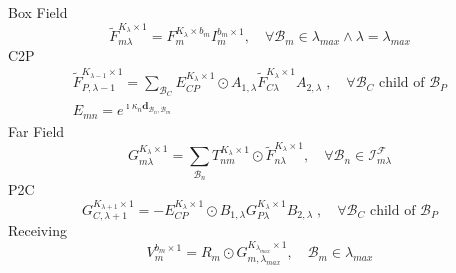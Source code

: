 \documentclass{report}
\begin{document}
Box Field
\begin{equation}
\tilde{F}_{m\lambda} ^{K_{\lambda} \times 1}= F_m^{{K_{\lambda}}\times b_m}I_m^{b_m\times 1}, \quad \forall \mathcal{B}_m \in \lambda_{max} \wedge  \lambda = \lambda_{max}
\end{equation}
C2P
\begin{equation}
\begin{aligned}
\tilde{F}_{P,\lambda-1} ^{K_{\lambda-1} \times 1} =\sum_{\mathcal{B}_C} E_{CP}^{K_{\lambda} \times 1} \odot A_{1,\lambda}\tilde{F}_{C\lambda} ^{K_{\lambda} \times 1}A_{2,\lambda}\;,\quad \forall \mathcal{B}_C \text{ child of } \mathcal{B}_P\\
E_{mn}=e^{\imath\kappa_n\mathbf{d}_{\mathcal{B}_n,\mathcal{B}_m}}~~~~~~~~~~~~~~~~~~~~~~~
\end{aligned}
\end{equation}
Far Field
\begin{equation}
G_{m\lambda}^{K_{\lambda} \times 1} =\sum_{\mathcal{B}_n} T_{nm}^{K_{\lambda} \times 1}\odot \tilde{F}_{n\lambda} ^{K_{\lambda} \times 1},\quad \forall \mathcal{B}_n \in \mathcal{I}_{m\lambda}^\mathcal{F}
\end{equation}
P2C
\begin{equation}
G_{C,\lambda+1}^{K_{\lambda+1} \times 1} = -E_{CP}^{K_{\lambda} \times 1}
\odot B_{1,\lambda}G_{P\lambda}^{K_{\lambda} \times 1}B_{2,\lambda}\;,\quad \forall \mathcal{B}_C \text{ child of } \mathcal{B}_P
\end{equation}
Receiving
\begin{equation}	
V_m^{b_m\times 1}=R_m\odot G_{m,\lambda_{max}}^{K_{\lambda_{max}}\times 1},\quad \mathcal{B}_m \in \lambda_{max}
\end{equation}
\end{document}
